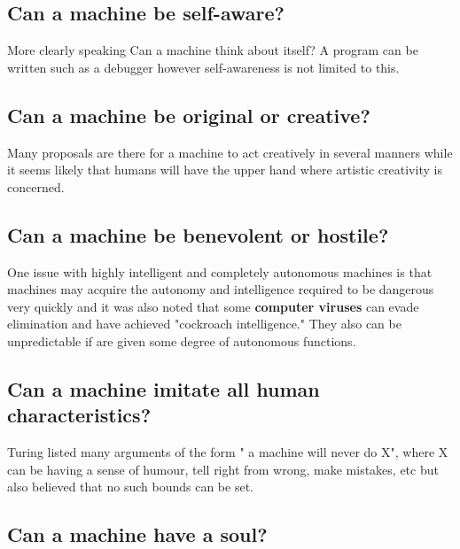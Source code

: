\documentclass[10pt,a4paper,twoside]{article}
\begin{document}
\subsection{Can a machine be self-aware?} More clearly speaking Can a machine think about itself? A program can be written such as a debugger however self-awareness is not limited to this.

\subsection{Can a machine be original or creative?} Many proposals are there for a machine to act creatively in several manners while it seems likely that humans will have the upper hand where artistic creativity is concerned.

\subsection{Can a machine be benevolent or hostile?} One issue with highly intelligent and completely autonomous machines is that machines may acquire the autonomy and intelligence required to be dangerous very quickly and it was also noted that some \textbf{computer viruses} can evade elimination and have achieved "cockroach intelligence." They also can be unpredictable if are given some degree of autonomous functions.

\subsection{Can a machine imitate all human characteristics?} Turing listed many arguments of the form " a machine will never do X", where X can be having a sense of humour, tell right from wrong, make mistakes, etc but also believed that no such bounds can be set.

\subsection{Can a machine have a soul?}
\end{document}
